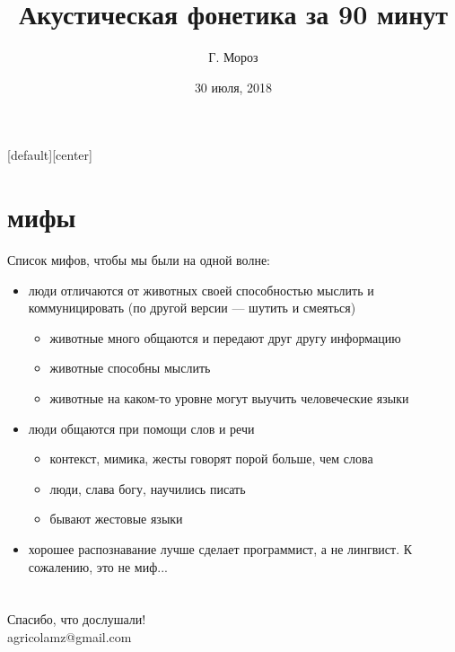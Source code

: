
[default][center]
\title[]{Акустическая фонетика за 90 минут}
\author[]{Г. Мороз}
\date{30 июля, 2018}

\frame{\titlepage}
\section{мифы}
\begin{frame}{Список мифов, чтобы мы были на одной волне:}
\begin{itemize}
\item люди отличаются от животных своей способностью мыслить и коммуницировать (по другой версии --- шутить и смеяться) \pause
\begin{itemize}
\item животные много общаются и передают друг другу информацию \pause
\item животные способны мыслить \pause
\item животные на каком-то уровне могут выучить человеческие языки \pause
\end{itemize}
\item люди общаются при помощи слов и речи \pause
\begin{itemize}
\item контекст, мимика, жесты говорят порой больше, чем слова \pause
\item люди, слава богу, научились писать \pause
\item бывают жестовые языки
\end{itemize}
\item хорошее распознавание лучше сделает программист, а не лингвист\pause . К сожалению, это не миф...
\end{itemize}
\end{frame}

\section{}
\begin{frame}
{\huge Спасибо, что дослушали!\bigskip\\
agricolamz@gmail.com
\vspace{-130pt}}
\end{frame}

